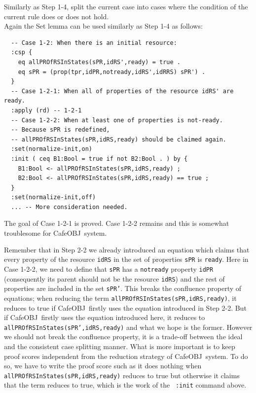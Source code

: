 \documentclass[12pt]{report}
\newcommand{\stt}[1]{{\small{\tt {#1}}}}
\newcommand{\cafeobj}{{\sf CafeOBJ}~}
\begin{document}
 Similarly as Step 1-4, split the current case
into cases where the condition of the current rule does or does not
hold. \\
Again the Set lemma can be used similarly as Step 1-4 as follows:
\small
\begin{verbatim}
  -- Case 1-2: When there is an initial resource:
  :csp {
    eq allPROfRSInStates(sPR,idRS',ready) = true .
    eq sPR = (prop(tpr,idPR,notready,idRS',idRRS) sPR') .
  }
  -- Case 1-2-1: When all of properties of the resource idRS' are ready.
  :apply (rd) -- 1-2-1
  -- Case 1-2-2: When at least one of properties is not-ready.
  -- Because sPR is redefined, 
  -- allPROfRSInStates(sPR,idRS,ready) should be claimed again.
  :set(normalize-init,on)
  :init ( ceq B1:Bool = true if not B2:Bool . ) by {
    B1:Bool <- allPROfRSInStates(sPR,idRS,ready) ;
    B2:Bool <- allPROfRSInStates(sPR,idRS,ready) == true ;
  }
  :set(normalize-init,off)
  ... -- More consideration needed.
\end{verbatim}
\normalsize
The goal of Case 1-2-1 is proved. Case 1-2-2 remains and this is somewhat
troublesome for \cafeobj system.

Remember that in Step 2-2 we already introduced an equation which
claims that every property of the resource {\tt idRS} in the set of
properties {\tt sPR} is {\tt ready}. Here in Case 1-2-2, we need to
define that {\tt sPR} has a {\tt notready} property {\tt idPR}
(consequently its parent should not be the resource {\tt idRS}) and
the rest of properties are included in the set {\tt sPR'}. This breaks
the confluence property of equations; when reducing the term
\stt{allPROfRSInStates(sPR,idRS,ready)}, it reduces to true if
\cafeobj firstly uses the equation introduced in Step 2-2. But if
\cafeobj firstly uses the equation introduced here, it reduces to
\stt{allPROfRSInStates(sPR',idRS,ready)} and what we hope is the
former. However we should not break the confluence property, it is a
trade-off between the ideal and the consistent case splitting manner.
What is more important is to keep proof scores independent from the
reduction strategy of \cafeobj system. To do so, we have to write the
proof score such as it does nothing when
\stt{allPROfRSInStates(sPR,idRS,ready)} reduces to true but otherwise
it claims that the term reduces to true, which is the work of the {\tt
  :init} command above.
\end{document}
